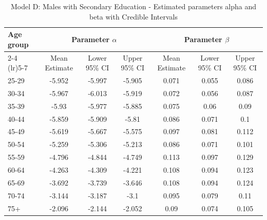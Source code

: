\begin{landscape}
\begin{table}[htbp]
\centering
\caption{Model D: Males with Secondary Education - Estimated parameters alpha and beta  with Credible Intervals}
\label{tab:parameters_ab31}
\begin{tabular}{@{}lcccccc@{}}
\toprule
Age group & \multicolumn{3}{c}{Parameter \(\alpha\)} & \multicolumn{3}{c}{Parameter \(\beta\)} \\ 
\cmidrule(lr){2-4} \cmidrule(lr){5-7}
          & Mean Estimate & Lower 95\% CI & Upper 95\% CI & Mean Estimate & Lower 95\% CI & Upper 95\% CI \\ 
\midrule
25-29 & -5.952 & -5.997 & -5.905 & 0.071 & 0.055 & 0.086 \\
30-34 & -5.967 & -6.013 & -5.919 & 0.072 & 0.056 & 0.087 \\
35-39 & -5.93 & -5.977 & -5.885 & 0.075 & 0.06 & 0.09 \\
40-44 & -5.859 & -5.909 & -5.81 & 0.086 & 0.071 & 0.1 \\
45-49 & -5.619 & -5.667 & -5.575 & 0.097 & 0.081 & 0.112 \\
50-54 & -5.259 & -5.306 & -5.213 & 0.086 & 0.071 & 0.101 \\
55-59 & -4.796 & -4.844 & -4.749 & 0.113 & 0.097 & 0.129 \\
60-64 & -4.263 & -4.309 & -4.221 & 0.108 & 0.094 & 0.123 \\
65-69 & -3.692 & -3.739 & -3.646 & 0.108 & 0.094 & 0.124 \\
70-74 & -3.144 & -3.187 & -3.1 & 0.095 & 0.079 & 0.11 \\
75+ & -2.096 & -2.144 & -2.052 & 0.09 & 0.074 & 0.105 \\
\bottomrule
\end{tabular}
\end{table}
\end{landscape}